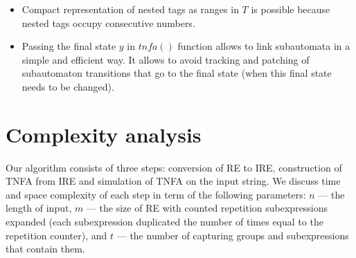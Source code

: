\documentclass[AMA,STIX1COL]{WileyNJD-v2}
\begin{document}
\begin{itemize}[itemsep=0.5em, topsep=0.5em]
    \item Compact representation of nested tags as ranges in $T$
        is possible because nested tags occupy consecutive numbers.

    \item Passing the final state $y$ in $tn\!f\!a()$ function allows to link subautomata in a simple and efficient way.
        It allows to avoid tracking and patching of subautomaton transitions that go to the final state
        (when this final state needs to be changed).
\end{itemize}


\section{Complexity analysis}\label{section_complexity}

Our algorithm consists of three steps: conversion of RE to IRE,
construction of TNFA from IRE
and simulation of TNFA on the input string.
We discuss time and space complexity of each step
in term of the following parameters:
$n$ --- the length of input,
$m$ --- the size of RE with counted repetition subexpressions expanded
(each subexpression duplicated the number of times equal to the repetition counter),
and $t$ --- the number of capturing groups and subexpressions that contain them.
\\
\end{document}
